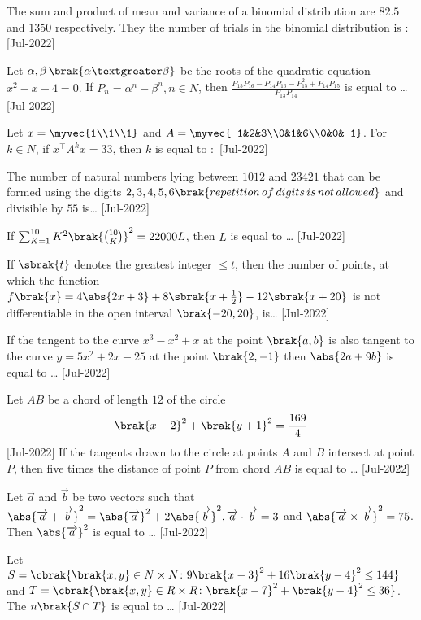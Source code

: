 \iffalse
\title{2022}
\author{EE24BTECH11021}
\section{integer}
\fi
    \item The sum and product of mean and variance of a binomial distribution are $82.5$ and $1350$ respectively. They the number of trials in the binomial distribution is $\colon$
    \hfill{[Jul-2022]}
    \item Let $\alpha,\beta\,\brak{\alpha\textgreater\beta}$ be the roots of the quadratic equation $x^2-x-4=0.$ If $P_n=\alpha^n-\beta^n,n\in N$, then $\frac{P_{15}P_{16}-P_{14}P_{16}-P^2_{15}+P_{14}P_{15}}{P_{13}P_{14}}$ is equal to \dots
    \hfill{[Jul-2022]}
    \item Let $x=\myvec{1\\1\\1}$ and $A=\myvec{-1&2&3\\0&1&6\\0&0&-1}$. For $k\in N$, if $x^\top A^k x=33$, then $k$ is equal to $\colon$
    \hfill{[Jul-2022]}
    \item The number of natural numbers lying between $1012$ and $23421$ that can be formed using the digits $2,3,4,5,6\brak{repetition\,of\,digits\,is\,not\,allowed}$ and divisible by $55$ is\dots
    \hfill{[Jul-2022]}
    \item If $\sum_{K=1}^{10}K^2\brak{\binom{10}{K}}^2=22000L$, then $L$ is equal to \dots
    \hfill{[Jul-2022]}
    \item If $\sbrak{t}$ denotes the greatest integer $\leq t$, then the number of points, at which the function $f\brak{x}=4\abs{2x+3}+8\sbrak{x+\frac{1}{2}}-12\sbrak{x+20}$ is not differentiable in the open interval $\brak{-20,20}$, is\dots
    \hfill{[Jul-2022]}
    \item If the tangent to the curve $x^3-x^2+x$ at the point $\brak{a,b}$ is also tangent to the curve $y=5x^2+2x-25$ at the point $\brak{2,-1}$ then $\abs{2a+9b}$ is equal to \dots
    \hfill{[Jul-2022]}
    \item Let $AB$ be a chord of length $12$ of the circle $$\brak{x-2}^2+\brak{y+1}^2=\frac{169}{4}$$
    \hfill{[Jul-2022]}
    If the tangents drawn to the circle at points $A$ and $B$ intersect at point $P$, then five times the distance of point $P$ from chord $AB$ is equal to \dots
    \hfill{[Jul-2022]}
    \item Let $\overrightarrow{a}$ and $\overrightarrow{b}$ be two vectors such that $\abs{\overrightarrow{a}+\overrightarrow{b}}^2=\abs{\overrightarrow{a}}^2+2\abs{\overrightarrow{b}}^2,\overrightarrow{a}\cdot\overrightarrow{b}=3$ and $\abs{\overrightarrow{a}\times\overrightarrow{b}}^2=75$. Then $\abs{\overrightarrow{a}}^2$ is equal to \dots
    \hfill{[Jul-2022]}
    \item Let $S=\cbrak{\brak{x,y}\in N\times N\colon9\brak{x-3}^2+16\brak{y-4}^2\leq 144}$\\
    and $T=\cbrak{\brak{x,y}\in R\times R\colon\brak{x-7}^2+\brak{y-4}^2\leq 36}$.\\
    The $n\brak{S\cap T}$ is equal to \dots
    \hfill{[Jul-2022]}
